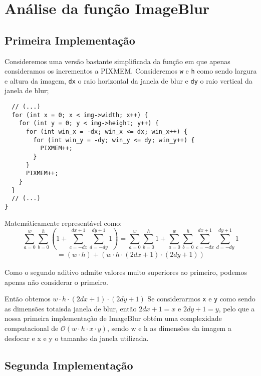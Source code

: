 \chapter{Análise da função ImageBlur}

\section{Primeira Implementação}
Consideremos uma versão bastante simplificada da função em que apenas consideramos os incrementos a PIXMEM. Consideremos
\verb|w| e \verb|h| como sendo largura e altura da imagem,
\verb|dx| o raio horizontal da janela de blur e \verb|dy| o
raio vertical da janela de blur;
\begin{listing}[H]
\begin{verbatim}
  // (...) 
  for (int x = 0; x < img->width; x++) {
    for (int y = 0; y < img->height; y++) {
      for (int win_x = -dx; win_x <= dx; win_x++) {
        for (int win_y = -dy; win_y <= dy; win_y++) {
          PIXMEM++;
        }
      }
      PIXMEM++;
    }
  }
  // (...)
}
\end{verbatim}
\end{listing}

Matemáticamente representável como:
\\
\begin{equation}
  \sum_{a=0}^{w}\sum_{b=0}^{h} (1 + \sum_{c=-dx}^{dx+1}\sum_{d=-dy}^{dy+1} 1) 
   = \sum_{a=0}^{w}\sum_{b=0}^{h} 1 +
  \sum_{a=0}^{w}\sum_{b=0}^{h} 
 \sum_{c=-dx}^{dx+1}\sum_{d=-dy}^{dy+1} 1
\end{equation}
\begin{align*}
 = (w \cdot h) + (w \cdot h \cdot (2dx + 1) \cdot (2dy + 1))
\end{align*}

Como o segundo aditivo admite valores muito superiores ao
primeiro, podemos apenas não considerar o primeiro.

Então obtemos $w\cdot h \cdot (2dx + 1) \cdot (2dy + 1)$
Se considerarmos \verb|x| e \verb|y| como sendo as dimensões totaisda janela de blur, então $2dx + 1 = x$ e $2dy + 1 = y$,
pelo que a nossa primeira implementação de ImageBlur obtém
uma complexidade computacional de $\mathcal{O}(w\cdot h\cdot
x\cdot y)$, sendo w e h as dimensões da imagem a desfocar e
x e y o tamanho da janela utilizada.



\section{Segunda Implementação}
